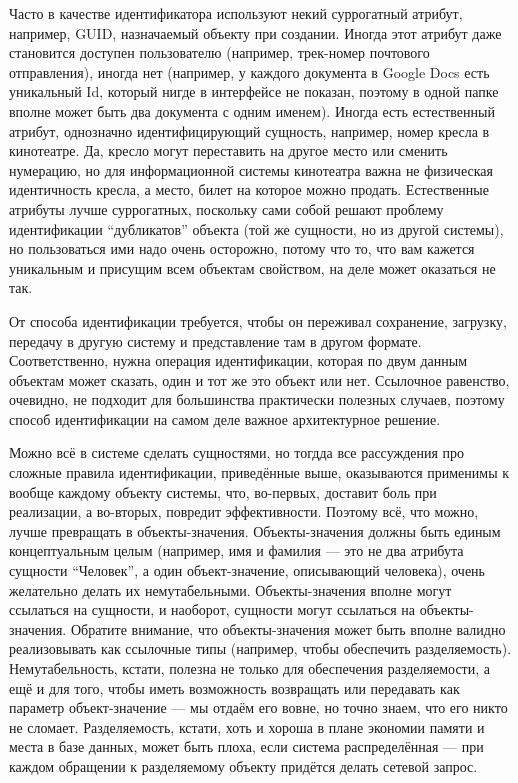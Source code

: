 \documentclass[a5paper]{article}
\begin{document}
Часто в качестве идентификатора используют некий суррогатный атрибут, например, GUID, назначаемый объекту при создании. Иногда этот атрибут даже становится доступен пользователю (например, трек-номер почтового отправления), иногда нет (например, у каждого документа в Google Docs есть уникальный Id, который нигде в интерфейсе не показан, поэтому в одной папке вполне может быть два документа с одним именем). Иногда есть естественный атрибут, однозначно идентифицирующий сущность, например, номер кресла в кинотеатре. Да, кресло могут переставить на другое место или сменить нумерацию, но для информационной системы кинотеатра важна не физическая идентичность кресла, а место, билет на которое можно продать. Естественные атрибуты лучше суррогатных, поскольку сами собой решают проблему идентификации ``дубликатов'' объекта (той же сущности, но из другой системы), но пользоваться ими надо очень осторожно, потому что то, что вам кажется уникальным и присущим всем объектам свойством, на деле может оказаться не так.

От способа идентификации требуется, чтобы он переживал сохранение, загрузку, передачу в другую систему и представление там в другом формате. Соответственно, нужна операция идентификации, которая по двум данным объектам может сказать, один и тот же это объект или нет. Ссылочное равенство, очевидно, не подходит для большинства практически полезных случаев, поэтому способ идентификации на самом деле важное архитектурное решение.

Можно всё в системе сделать сущностями, но тогдда все рассуждения про сложные правила идентификации, приведённые выше, оказываются применимы к вообще каждому объекту системы, что, во-первых, доставит боль при реализации, а во-вторых, повредит эффективности. Поэтому всё, что можно, лучше превращать в объекты-значения. Объекты-значения должны быть единым концептуальным целым (например, имя и фамилия --- это не два атрибута сущности ``Человек'', а один объект-значение, описывающий человека), очень желательно делать их немутабельными. Объекты-значения вполне могут ссылаться на сущности, и наоборот, сущности могут ссылаться на объекты-значения. Обратите внимание, что объекты-значения может быть вполне валидно реализовывать как ссылочные типы (например, чтобы обеспечить разделяемость). Немутабельность, кстати, полезна не только для обеспечения разделяемости, а ещё и для того, чтобы иметь возможность возвращать или передавать как параметр объект-значение --- мы отдаём его вовне, но точно знаем, что его никто не сломает. Разделяемость, кстати, хоть и хороша в плане экономии памяти и места в базе данных, может быть плоха, если система распределённая --- при каждом обращении к разделяемому объекту придётся делать сетевой запрос.
\end{document}
